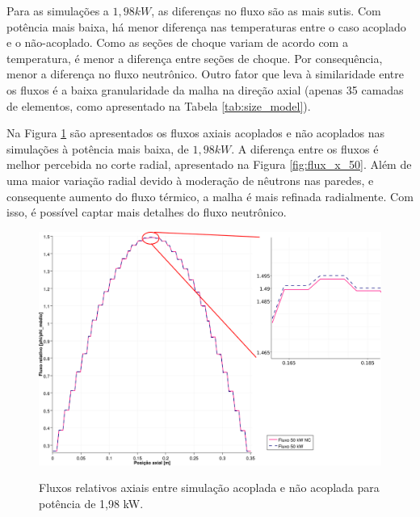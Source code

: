 Para as simulações a $1,98 kW$, as diferenças no fluxo são as mais sutis. Com potência mais baixa, há menor
diferença nas temperaturas entre o caso acoplado e o não-acoplado. Como as seções de choque variam de
acordo com a temperatura, é menor a diferença entre seções de choque. Por consequência, menor a diferença
no fluxo neutrônico. Outro fator que leva à similaridade entre os fluxos é a baixa granularidade
da malha na direção axial (apenas 35 camadas de elementos, como apresentado na Tabela \ref{tab:size_model}).

Na Figura \ref{fig:flux_z_50} são apresentados os fluxos axiais acoplados e não acoplados nas simulações
à potência mais baixa, de $1,98 kW$. A diferença entre os fluxos é melhor percebida no corte radial,
apresentado na Figura \ref{fig:flux_x_50}. Além de uma maior variação radial devido à moderação de nêutrons
nas paredes, e consequente aumento do fluxo térmico, a malha é mais refinada radialmente. Com isso, é possível
captar mais detalhes do fluxo neutrônico.


\begin{figure}[htb]
  \caption{Fluxos relativos axiais entre simulação acoplada e não acoplada para
    potência de 1,98 kW.}
  \centering\includegraphics[scale=0.5]{figuras/Flux_rel_z_50_port_trabalhado.png}
  \label{fig:flux_z_50}
\end{figure}

